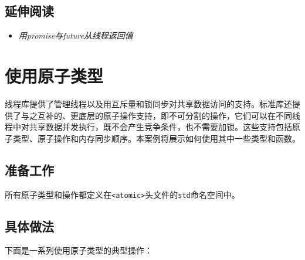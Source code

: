 
\subsection{延伸阅读}



\begin{itemize}
\item \textit{用promise与future从线程返回值}

\end{itemize}



\section{使用原子类型}



线程库提供了管理线程以及用互斥量和锁同步对共享数据访问的支持。标准库还提供了与之互补的、更底层的原子操作支持，即不可分割的操作，它们可以在不同线程中对共享数据并发执行，既不会产生竞争条件，也不需要加锁。这些支持包括原子类型、原子操作和内存同步顺序。本案例将展示如何使用其中一些类型和函数。



\subsection{准备工作}



所有原子类型和操作都定义在\texttt{<\allowbreak{}atomic>}头文件的\texttt{std}命名空间中。



\subsection{具体做法}



下面是一系列使用原子类型的典型操作：


